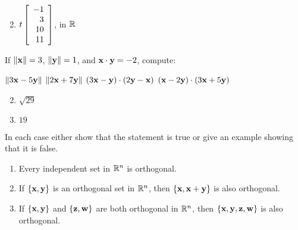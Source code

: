 \begin{multicols}{2}
\begin{ex}
\begin{enumerate}[label={\alph*.}]
\end{enumerate}
\begin{sol}
\begin{enumerate}[label={\alph*.}]
\setcounter{enumi}{1}
\item 
$t \left[ \begin{array}{r}
-1\\
3\\
10\\
11
\end{array} \right]$, in $\mathbb{R}$

\end{enumerate}
\end{sol}
\end{ex}

\begin{ex}
If $\|\textbf{x}\| = 3$, $\|\textbf{y}\| = 1$, and $\textbf{x} \cdot \textbf{y} = -2$, compute:

\begin{exenumerate}
\exitem $\| 3\textbf{x} - 5\textbf{y}\|$
\exitem $\| 2\textbf{x} + 7\textbf{y}\|$
\exitem $(3\textbf{x} - \textbf{y}) \cdot (2\textbf{y} - \textbf{x})$
\exitem $(\textbf{x} - 2\textbf{y}) \cdot (3\textbf{x} + 5\textbf{y})$
\end{exenumerate}
\begin{sol}
\begin{enumerate}[label={\alph*.}]
\setcounter{enumi}{1}
\item  $\sqrt{29}$

\setcounter{enumi}{3}
\item  $19$

\end{enumerate}
\end{sol}
\end{ex}

\begin{ex}
In each case either show that the statement is true or give an example showing that it is false.

\begin{enumerate}[label={\alph*.}]
\item Every independent set in $\mathbb{R}^n$ is orthogonal.

\item If $\{\textbf{x}, \textbf{y}\}$ is an orthogonal set in $\mathbb{R}^n$, then $\{\textbf{x}, \textbf{x} + \textbf{y}\}$ is also orthogonal.

\item If $\{\textbf{x}, \textbf{y}\}$ and $\{\textbf{z}, \textbf{w}\}$ are both orthogonal in $\mathbb{R}^n$, then $\{\textbf{x}, \textbf{y}, \textbf{z}, \textbf{w}\}$ is also orthogonal.


\end{enumerate}
\end{ex}
\end{multicols}
